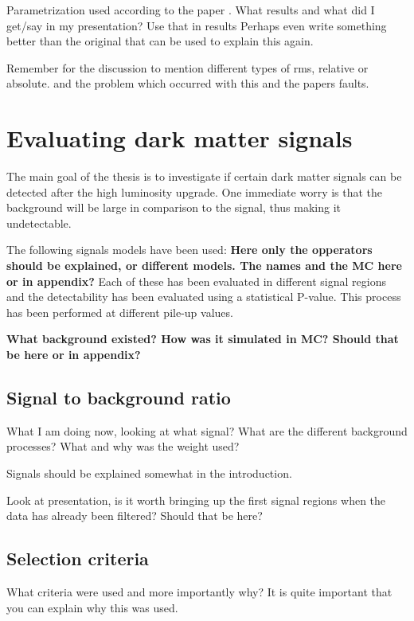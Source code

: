 Parametrization used according to the paper \citep{ATL-PHYS-PUB-2013-004}. What results and what did I get/say in my presentation? Use that in results Perhaps even write something better than the original that can be used to explain this again.

Remember for the discussion to mention different types of rms, relative or absolute. and the problem which occurred with this and the papers faults.

\section{Evaluating dark matter signals}
The main goal of the thesis is to investigate if certain dark matter signals can be detected after the high luminosity upgrade. One immediate worry is that the background will be large in comparison to the signal, thus making it undetectable. 

The following signals models have been used:
\textbf{Here only the opperators should be explained, or different models. The names and the MC here or in appendix?}
Each of these has been evaluated in different signal regions and the detectability has been evaluated using a statistical P-value. This process has been performed at different pile-up values. 

\textbf{What background existed? How was it simulated in MC? Should that be here or in appendix?}


\subsection{Signal to background ratio}
What I am doing now, looking at what signal? What are the different background processes? What and why was the weight used?

Signals should be explained somewhat in the introduction.



Look at presentation, is it worth bringing up the first signal regions when the data has already been filtered? Should that be here?
 
\subsection{Selection criteria}
What criteria were used and more importantly why? It is quite important that you can explain why this was used.

